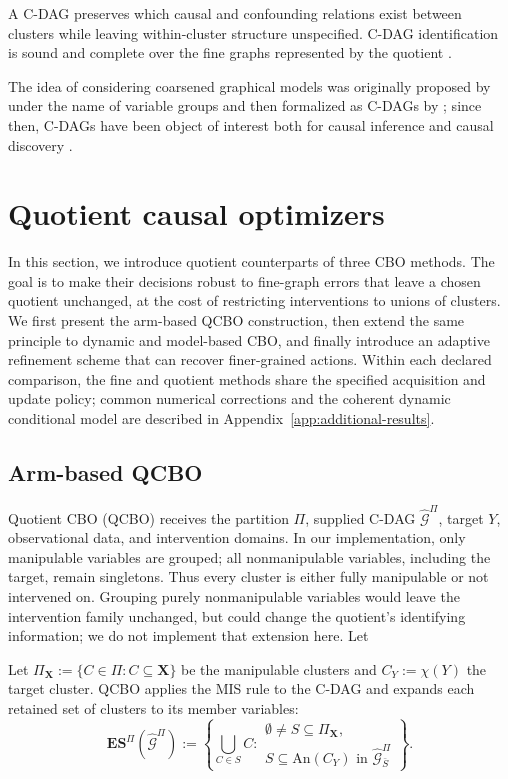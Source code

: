 \documentclass[twoside]{article}
\newcommand{\An}{\mathrm{An}}
\newcommand{\Gg}{\mathcal{G}}
\newcommand{\ESpi}{\mathbf{ES}^{\Pi}}
\begin{document}
A C-DAG preserves which causal and confounding relations exist between clusters while leaving within-cluster structure unspecified. C-DAG identification is sound and complete over the fine graphs represented by the quotient \citep{CausalEffectIdentification}.

The idea of considering coarsened graphical models was originally proposed by \citet{parviainen2017learning} under the name of variable groups and then formalized as C-DAGs by \citet{CausalEffectIdentification}; since then, C-DAGs have been object of interest both for causal inference \citep{ferreira2025identifying} and causal discovery \citep{ninad2025causal,wahl2024foundations,anand2026causal}.

\section{Quotient causal optimizers}
\label{sec:methods}
In this section, we introduce quotient counterparts of three CBO methods. The goal is to make their decisions robust to fine-graph errors that leave a chosen quotient unchanged, at the cost of restricting interventions to unions of clusters. We first present the arm-based QCBO construction, then extend the same principle to dynamic and model-based CBO, and finally introduce an adaptive refinement scheme that can recover finer-grained actions. Within each declared comparison, the fine and quotient methods share the specified acquisition and update policy; common numerical corrections and the coherent dynamic conditional model are described in Appendix~\ref{app:additional-results}.

\subsection{Arm-based QCBO}

Quotient CBO (QCBO) receives the partition \(\Pi\), supplied C-DAG \(\widehat{\Gg}^{\Pi}\), target \(Y\), observational data, and intervention domains. In our implementation, only manipulable variables are grouped; all nonmanipulable variables, including the target, remain singletons. Thus every cluster is either fully manipulable or not intervened on. Grouping purely nonmanipulable variables would leave the intervention family unchanged, but could change the quotient's identifying information; we do not implement that extension here. Let

Let $\Pi_{\mathbf X}:=\{C\in\Pi:C\subseteq\mathbf X\}$ be the
manipulable clusters and $C_Y:=\chi(Y)$ the target cluster.
QCBO applies the MIS rule to the C-DAG and expands each retained
set of clusters to its member variables:
\begin{equation}
\ESpi(\widehat{\Gg}^{\Pi})
:=\left\{\bigcup_{C\in S}C:
\substack{\emptyset\ne S\subseteq\Pi_{\mathbf X},\\
S\subseteq\An(C_Y)\text{ in }\widehat{\Gg}^{\Pi}_{\bar S}}
\right\}.
\label{eq:qcbo-arms}
\end{equation}
\end{document}

